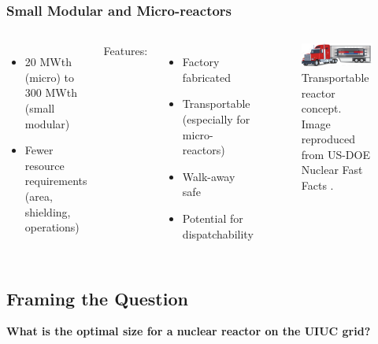 \begin{frame}
\frametitle{Small Modular and Micro-reactors}
\begin{columns}
	\column[t]{5cm}
	\begin{itemize}
		\item 20 MWth (micro) to 300 MWth (small modular)
		\item Fewer resource requirements (area, shielding, operations)
	\end{itemize}
	\vspace{0.6cm}
	Features:
	\begin{itemize}
		\item Factory fabricated
		\item Transportable (especially for micro-reactors)
		\item Walk-away safe
    \item Potential for dispatchability
	\end{itemize}

    \column[t]{6cm}
	\begin{figure}[htbp!]
		\begin{center}
			\includegraphics[width=5.8cm]{../hydrogen-production-pres/images/microreactor.png}
		\end{center}
		\caption{Transportable reactor concept. Image reproduced from US-DOE Nuclear Fast Facts \cite{us-doe_ultimate_2019}.}
	\end{figure}
\end{columns}
\end{frame}

\subsection{Framing the Question}
\begin{frame}
  \begin{center}
    \Huge{\textbf{What is the optimal size for a nuclear reactor on the UIUC grid?}}
  \end{center}
\end{frame}

